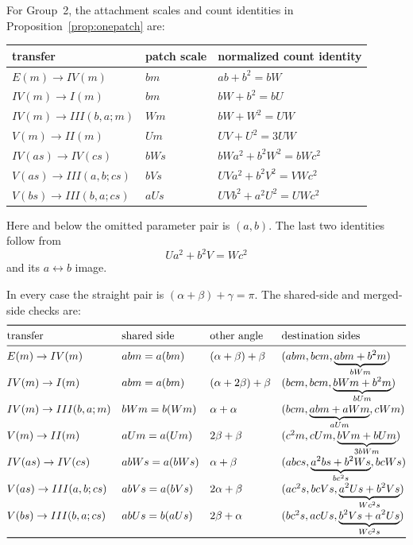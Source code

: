 \documentclass[11pt]{amsart}
\theoremstyle{definition}
\theoremstyle{remark}
\begin{document}
For Group~2, the attachment scales and count identities in
Proposition~\ref{prop:onepatch} are:
\begin{center}
\small
\renewcommand{\arraystretch}{1.12}
\begin{tabular}{@{}lll@{}}
\toprule
transfer & patch scale & normalized count identity \\
\midrule
$E(m)\to IV(m)$ & $bm$ & $ab+b^2=bW$ \\
$IV(m)\to I(m)$ & $bm$ & $bW+b^2=bU$ \\
$IV(m)\to III(b,a;m)$ & $Wm$ & $bW+W^2=UW$ \\
$V(m)\to II(m)$ & $Um$ & $UV+U^2=3UW$ \\
$IV(as)\to IV(cs)$ & $bWs$ & $bWa^2+b^2W^2=bWc^2$ \\
$V(as)\to III(a,b;cs)$ & $bVs$ &
  $UVa^2+b^2V^2=VWc^2$ \\
$V(bs)\to III(b,a;cs)$ & $aUs$ &
  $UVb^2+a^2U^2=UWc^2$ \\
\bottomrule
\end{tabular}
\end{center}
Here and below the omitted parameter pair is $(a,b)$.  The last two
identities follow from
\[
Ua^2+b^2V=Wc^2
\]
and its $a\leftrightarrow b$ image.

In every case the straight pair is
$(\alpha+\beta)+\gamma=\pi$.  The shared-side and merged-side checks are:
\[
\renewcommand{\arraystretch}{1.15}
\begin{array}{@{}llll@{}}
\toprule
\text{transfer}&\text{shared side}&\text{other angle}
 &\text{destination sides}\\
\midrule
E(m)\to IV(m)
 &abm=a(bm)&(\alpha+\beta)+\beta
 &(abm,bcm,\underbrace{abm+b^2m}_{bWm})\\
IV(m)\to I(m)
 &abm=a(bm)&(\alpha+2\beta)+\beta
 &(bcm,bcm,\underbrace{bWm+b^2m}_{bUm})\\
IV(m)\to III(b,a;m)
 &bWm=b(Wm)&\alpha+\alpha
 &(bcm,\underbrace{abm+aWm}_{aUm},cWm)\\
V(m)\to II(m)
 &aUm=a(Um)&2\beta+\beta
 &(c^2m,cUm,\underbrace{bVm+bUm}_{3bWm})\\
IV(as)\to IV(cs)
 &abWs=a(bWs)&\alpha+\beta
 &(abcs,\underbrace{a^2bs+b^2Ws}_{bc^2s},bcWs)\\
V(as)\to III(a,b;cs)
 &abVs=a(bVs)&2\alpha+\beta
 &(ac^2s,bcVs,\underbrace{a^2Us+b^2Vs}_{Wc^2s})\\
V(bs)\to III(b,a;cs)
 &abUs=b(aUs)&2\beta+\alpha
 &(bc^2s,acUs,\underbrace{b^2Vs+a^2Us}_{Wc^2s})\\
\bottomrule
\end{array}
\]
\end{document}
